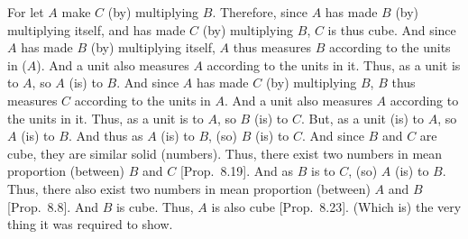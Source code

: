 \begin{Parallel}{}{}
{For let $A$ make $C$ (by) multiplying $B$. Therefore, since $A$
has made $B$ (by) multiplying itself, and has made $C$ (by) multiplying 
$B$, $C$ is thus cube. And since $A$ has made $B$ (by)
multiplying itself, $A$ thus measures $B$ according to the units in ($A$).
And a unit also measures $A$ according to the units in it. Thus, as
a unit is to $A$, so $A$ (is) to $B$. And since $A$ has made $C$ (by)
multiplying $B$, $B$ thus measures $C$ according to the units in $A$.
And a unit also measures $A$ according to the units in it. Thus, as
a unit is to $A$, so $B$ (is) to $C$. But, as a unit (is) to $A$, so $A$ (is)
to $B$. And thus as $A$ (is) to $B$, (so) $B$ (is) to $C$. And since $B$
and $C$ are cube, they are similar solid (numbers). Thus,
there exist two numbers in mean proportion (between) $B$ and $C$ [Prop.~8.19]. And as $B$ is to $C$, (so) $A$ (is)
to $B$. Thus, there also exist two numbers in mean proportion (between) $A$ and
$B$ [Prop.~8.8].  And $B$ is  cube. Thus, $A$
is also  cube   [Prop.~8.23]. (Which is)
the very thing it was required to show.}
\end{Parallel}

